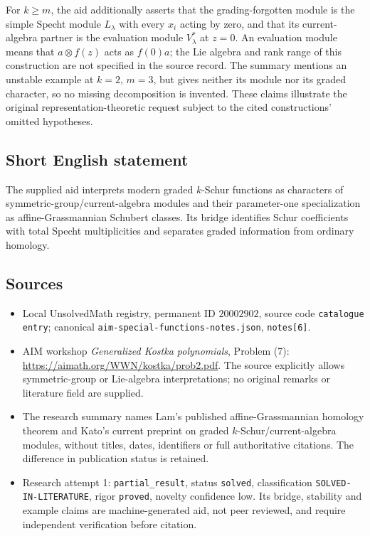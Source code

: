 \documentclass[11pt]{article}
\begin{document}
For $k\geq m$, the aid additionally asserts that the grading-forgotten module is the simple Specht module $L_\lambda$ with every $x_i$ acting by zero, and that its current-algebra partner is the evaluation module $V_\lambda^*$ at $z=0$. An evaluation module means that $a\otimes f(z)$ acts as $f(0)a$; the Lie algebra and rank range of this construction are not specified in the source record. The summary mentions an unstable example at $k=2$, $m=3$, but gives neither its module nor its graded character, so no missing decomposition is invented. These claims illustrate the original representation-theoretic request subject to the cited constructions' omitted hypotheses.
\subsection{Short English statement}
The supplied aid interprets modern graded $k$-Schur functions as characters of symmetric-group/current-algebra modules and their parameter-one specialization as affine-Grassmannian Schubert classes. Its bridge identifies Schur coefficients with total Specht multiplicities and separates graded information from ordinary homology.
\subsection{Sources}
\begin{itemize}
\item Local UnsolvedMath registry, permanent ID $20002902$, source code \texttt{catalogue entry}; canonical \texttt{aim-special-functions-notes.json}, \texttt{notes[6]}.
\item AIM workshop \emph{Generalized Kostka polynomials}, Problem (7): \url{https://aimath.org/WWN/kostka/prob2.pdf}. The source explicitly allows symmetric-group or Lie-algebra interpretations; no original remarks or literature field are supplied.
\item The research summary names Lam's published affine-Grassmannian homology theorem and Kato's current preprint on graded $k$-Schur/current-algebra modules, without titles, dates, identifiers or full authoritative citations. The difference in publication status is retained.
\item Research attempt 1: \texttt{partial\_result}, status \texttt{solved}, classification \texttt{SOLVED-IN-LITERATURE}, rigor \texttt{proved}, novelty confidence low. Its bridge, stability and example claims are machine-generated aid, not peer reviewed, and require independent verification before citation.
\end{itemize}
\end{document}
